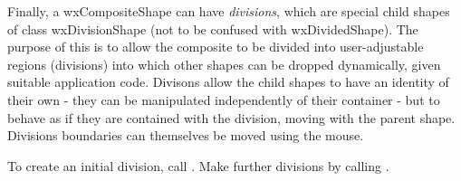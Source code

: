 Finally, a wxCompositeShape can have {\it divisions}, which are special child shapes of class
wxDivisionShape (not to be confused with wxDividedShape). The purpose of this is to allow
the composite to be divided into user-adjustable regions (divisions) into which other shapes
can be dropped dynamically, given suitable application code. Divisons allow the child
shapes to have an identity of their own - they can be manipulated independently of their container -
but to behave as if they are contained with the division, moving with the parent shape.
Divisions boundaries can themselves be moved using the mouse.

To create an initial division, call .
Make further divisions by calling .

